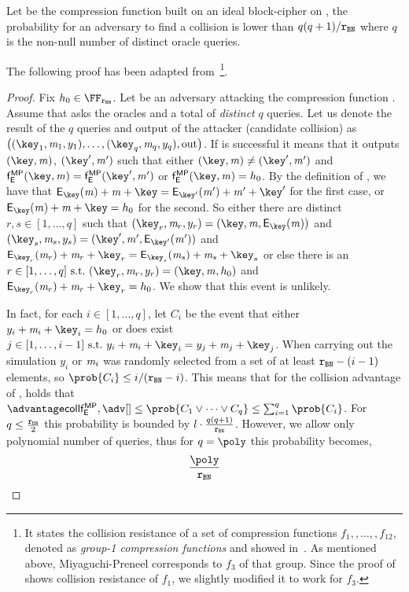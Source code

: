 \begin{lemma}\label{lemma:colrescomp}
    Let \fMP{} be the \MP{} compression function built on an ideal block-cipher \Enc{} on \FFx{\rBN}, the probability for an adversary \adv{} to find a collision is lower than $q(q+1)/\mathtt{r_{BN}}$ where $q$ is the non-null number of distinct oracle queries.
\end{lemma}

The following proof has been adapted from~\cite[Lemma 3.3]{black2002black}\footnote{It states the collision resistance of a set of compression functions $f_1,,\ldots,,f_{12}$, denoted as \emph{group-1 compression functions} and showed in~\cite[Figure 3]{black2002black}. As mentioned above, Miyaguchi-Preneel corresponds to $f_3$ of that group. Since the proof of~\cite[Lemma 3.3]{black2002black} shows collision resistance of $f_1$, we slightly modified it to work for $f_3$.}. 

\begin{proof}
    Fix $h_0\in\FFx{\rBN}$. Let \adv{} be an adversary attacking the compression function \fMP{}.
    Assume that \adv{} asks the oracles \oracleEnc{} and \oracleDec{} a total of \emph{distinct} $q$ queries. Let us denote the result of the $q$ queries and output of the attacker (candidate collision) as $\left ( (\key_1, \msg_1, y_1), \ldots , (\key_q, \msg_q, y_q), \text{out} \right )$. If \adv{} is successful it means that it outputs $(\key, \msg)$, $(\key', \msg')$ such that either $(\key, \msg) \neq (\key', \msg')$ and $\fMP(\key, \msg) = \fMP(\key', \msg')$ or $\fMP(\key, \msg) = h_0$. By the definition of \fMP, we have that $\Enc_\key(\msg) + \msg + \key = \Enc_{\key'}(\msg') + \msg' + \key'$ for the first case, or $\Enc_\key(\msg) + \msg + \key = h_0$ for the second. So either there are distinct $r, s \in [1,\ldots, q]$ such that $(\key_r, \msg_r, y_r) = (\key, \msg, \Enc_\key(\msg))$ and $(\key_s,\msg_s, y_s) = (\key',\msg', \Enc_{\key'}(\msg'))$ and $\Enc_{\key_r}(\msg_r) + \msg_r + \key_r = \Enc_{\key_s}(\msg_s) + \msg_s + \key_s$ or else there is an $r \in [1,\ldots, q]\ \suchthat\ (\key_r, \msg_r, y_r) = (\key, \msg, h_0)$ and $\Enc_{\key_r}(\msg_r) + \msg_r + \key_r = h_0$. We show that this event is unlikely.

    In fact, for each $i \in [1,\ldots, q]$, let $C_i$ be the event that either $y_i + \msg_i + \key_i = h_0$ or does exist $j \in [1,\ldots, i-1]\ \suchthat\ y_i + \msg_i + \key_i = y_j + \msg_j + \key_j$. When carrying out the simulation $y_i$ or $\mathit{m}_i$ was randomly selected from a set of at least $\mathtt{r_{BN}} - (i-1)$ elements, so $\prob{C_i}\leq i / (\rBN-i)$. This means that for the collision advantage of \adv{}, \advCollMP holds that $\advCollMP \leq \prob{C_1 \lor \cdots \lor C_q} \leq \sum_{i=1}^{q} \prob{C_i}$. For $q \leq \frac{\mathtt{r_{BN}}}{2}$ this probability is bounded by $l \cdot \frac{q(q+1)}{\mathtt{r_{BN}}}$. However, we allow only polynomial number of queries, thus for $q = \poly$ this probability becomes,
        \[
            \frac{\poly}{\rBN}
        \]
\end{proof}

